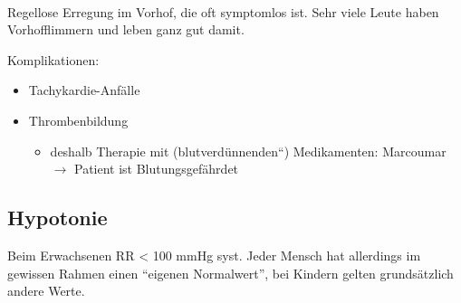 \paragraph{}

Regellose Erregung im Vorhof, die oft symptomlos ist. 
Sehr viele Leute haben Vorhofflimmern und leben ganz gut damit.

Komplikationen:
\begin{itemize}
    \item Tachykardie-Anfälle
    \item Thrombenbildung
    \begin{itemize}
        \item deshalb Therapie mit 
        ({\quotedblbase}blutverdünnenden{\textquotedblleft}) Medikamenten:
        Marcoumar ${\rightarrow}$ Patient ist Blutungsgefährdet
    \end{itemize}
\end{itemize}

\subsection{Hypotonie}

 
 Beim Erwachsenen RR {\textless} 100 mmHg
syst. Jeder Mensch hat allerdings im gewissen Rahmen einen
"`eigenen Normalwert"', bei Kindern gelten grundsätzlich
andere Werte.

% 
% 
% 
% 


